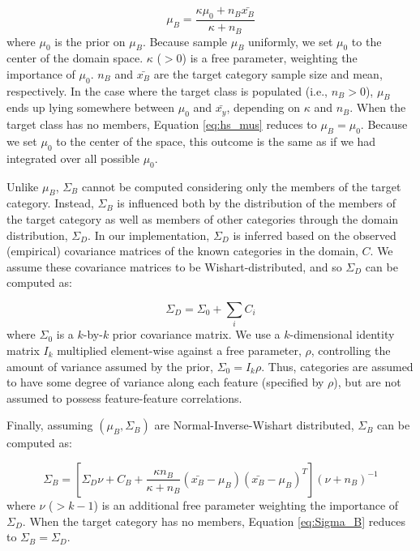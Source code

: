 \documentclass[10pt,letterpaper]{article}
\begin{document}
\begin{equation}
  \mu_B = \dfrac
    {\kappa\mu_{0} + n_B \bar{x_B}}
    {\kappa + n_B}
    \label{eq:hs_mus}
\end{equation}
% 
where $\mu_0$ is the prior on $\mu_B$. Because \citet{jern2013probabilistic} sample $\mu_B$ uniformly, we set $\mu_0$ to the center of the domain space. $\kappa$ ($>0$) is a free parameter, weighting the importance of $\mu_0$. $n_B$ and $\bar{x_B}$ are the target category sample size and mean, respectively. In the case where the target class is populated (i.e., $n_B > 0$), $\mu_{B}$ ends up lying somewhere between $\mu_{0}$ and $\bar{x_y}$, depending on $\kappa$ and $n_B$. When the target class has no members, Equation \ref{eq:hs_mus} reduces to $\mu_{B} = \mu_{0}$. Because we set $\mu_0$ to the center of the space, this outcome is the same as if we had integrated over all possible $\mu_0$.

Unlike $\mu_B$, $\Sigma_B$ cannot be computed considering only the members of the target category. Instead, $\Sigma_B$ is influenced both by the distribution of the members of the target category as well as members of other categories through the domain distribution, $\Sigma_D$. In our implementation, $\Sigma_D$ is inferred based on the observed (empirical)  covariance matrices of the known categories in the domain, $C$. We assume these covariance matrices to be Wishart-distributed, and so $\Sigma_D$ can be computed as:

\begin{equation}
    \Sigma_D = \Sigma_0 + \sum_{i}{C_i}
\end{equation}
%
where $\Sigma_{0}$ is a $k$-by-$k$ prior covariance matrix. We use a $k$-dimensional identity matrix $I_k$ multiplied element-wise against a free parameter, $\rho$, controlling the amount of variance assumed by the prior, $\Sigma_0 =  I_k\rho$. Thus, categories are assumed to have some degree of variance along each feature (specified by $\rho$), but are not assumed to possess feature-feature correlations.

Finally, assuming $(\mu_B, \Sigma_B)$ are Normal-Inverse-Wishart distributed, $\Sigma_B$ can be computed as:

\begin{equation}
  \Sigma_B = [\Sigma_D \nu + C_B +
    \dfrac
    {\kappa n_B}
    {\kappa + n_B}
    (\bar{x_B}-\mu_B)(\bar{x_B}-\mu_B)^T
  ] (\nu + n_B)^{-1}
  \label{eq:Sigma_B}
\end{equation}
%
where $\nu$ ($>k-1$) is an additional free parameter weighting the importance of $\Sigma_{D}$. When the target category has no members, Equation \ref{eq:Sigma_B} reduces to $\Sigma_B = \Sigma_D$. 
\end{document}
